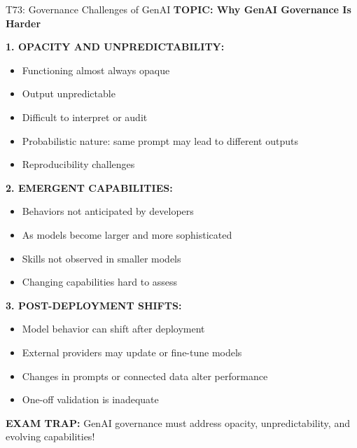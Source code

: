 \documentclass[8pt]{beamer}
\begin{document}
	\begin{frame}{T73: Governance Challenges of GenAI}
		\fontsize{6.5}{7.5}\selectfont
		\textbf{TOPIC: Why GenAI Governance Is Harder}
		
		\vspace{0.1cm}
		\textbf{1. OPACITY AND UNPREDICTABILITY:}
		\begin{itemize}
			\item Functioning almost always opaque
			\item Output unpredictable
			\item Difficult to interpret or audit
			\item Probabilistic nature: same prompt may lead to different outputs
			\item Reproducibility challenges
		\end{itemize}
		
		\vspace{0.1cm}
		\textbf{2. EMERGENT CAPABILITIES:}
		\begin{itemize}
			\item Behaviors not anticipated by developers
			\item As models become larger and more sophisticated
			\item Skills not observed in smaller models
			\item Changing capabilities hard to assess
		\end{itemize}
		
		\vspace{0.1cm}
		\textbf{3. POST-DEPLOYMENT SHIFTS:}
		\begin{itemize}
			\item Model behavior can shift after deployment
			\item External providers may update or fine-tune models
			\item Changes in prompts or connected data alter performance
			\item One-off validation is inadequate
		\end{itemize}
		
		\textcolor{myred}{\textbf{EXAM TRAP:}} GenAI governance must address \textcolor{myblue}{opacity, unpredictability, and evolving capabilities}!
	\end{frame}
	
\end{document}
